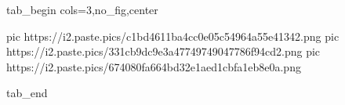  
 
 
 
 


\ifcmt
  tab_begin cols=3,no_fig,center

     pic https://i2.paste.pics/c1bd4611ba4cc0e05c54964a55e41342.png
		 pic https://i2.paste.pics/331cb9dc9e3a47749749047786f94cd2.png
		 pic https://i2.paste.pics/674080fa664bd32e1aed1cbfa1eb8e0a.png

  tab_end
\fi
